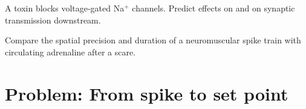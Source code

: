 \begin{exercise}[$\star\star\star$]\label{exo:g12:nerves-hormones:11}
A toxin blocks voltage-gated Na$^{+}$ channels. Predict effects on
 and on synaptic transmission downstream.
\end{exercise}

\begin{exercise}[$\star\star\star$]\label{exo:g12:nerves-hormones:12}
Compare the spatial precision and duration of a neuromuscular spike
train with circulating adrenaline after a scare.
\end{exercise}

\section{Problem: From spike to set point}

